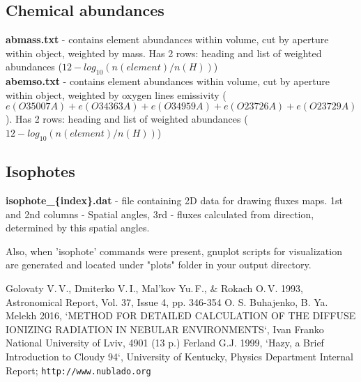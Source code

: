 \documentclass[a4paper]{article}
\begin{document}
\subsection{Chemical abundances}
{\bf abmass.txt} - contains element abundances within volume, cut by aperture within object, weighted by mass.
Has 2 rows: heading and list of weighted abundances ($12 - log_{10}(n(element)/n(H))$) \\

{\bf abemso.txt} - contains element abundances within volume, cut by aperture within object, weighted by oxygen
lines emissivity ($e(O3 5007A) + e(O3 4363A) + e(O3 4959A) + e(O2 3726A) + e(O2 3729A)$).
Has 2 rows: heading and list of weighted abundances ($12 - log_{10}(n(element)/n(H))$)

\subsection{Isophotes}

{\bf isophote_\{index\}.dat} - file containing 2D data for drawing fluxes maps.
1st and 2nd columns - Spatial angles, 3rd - fluxes calculated from direction, determined by this spatial angles.

Also, when 'isophote' commands were present, gnuplot scripts for visualization are generated and located under "plots"
folder in your output directory.


\begin{thebibliography}{3}
{\small
{} Golovaty V.\,V., Dmiterko V.\,I., Mal'kov Yu.\,F., \& Rokach O.\,V. 1993, Astronomical Report, Vol. 37, Issue 4, pp. 346-354
 O. S. Buhajenko, B. Ya. Melekh 2016, `METHOD FOR DETAILED CALCULATION OF THE DIFFUSE IONIZING RADIATION IN NEBULAR ENVIRONMENTS`, Ivan Franko National University of Lviv, 4901 (13 p.) 
 Ferland G.J. 1999, `Hazy, a Brief Introduction to Cloudy 94`, University of Kentucky, Physics Department Internal Report; \texttt{http://www.nublado.org}
}
\end{thebibliography}
\end{document}
